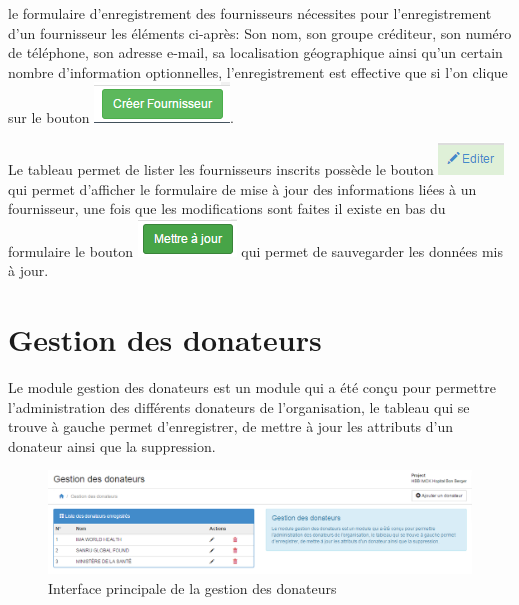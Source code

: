 \documentclass[12pt,a4paper]{report}
\begin{document}
le formulaire d'enregistrement des fournisseurs nécessites pour l'enregistrement d'un fournisseur les éléments ci-après: Son nom, son groupe créditeur, son numéro de téléphone, son adresse e-mail, sa localisation géographique ainsi qu'un certain nombre d'information optionnelles, l'enregistrement est effective que si l'on clique sur le bouton \includegraphics[scale=0.7]{pic/CreatSupplier.png}.

Le tableau permet de lister les fournisseurs inscrits possède le bouton \includegraphics[scale=0.7]{pic/EditSupplier.png} qui permet d'afficher le formulaire de mise à jour des informations liées à un fournisseur, une fois que les modifications sont faites il existe en bas du formulaire le bouton \includegraphics[scale=0.7]{pic/MettreJourSuppl.png} qui permet de sauvegarder les données mis à jour.
\newpage

\section{Gestion des donateurs}
Le module gestion des donateurs est un module qui a été conçu pour permettre l'administration des différents donateurs de l'organisation, le tableau qui se trouve à gauche permet d’enregistrer, de mettre à jour les attributs d'un donateur ainsi que la suppression.
\begin{figure}[h]
\begin{center}
\includegraphics[width=14cm]{pic/GestionDonateur.png}
\end{center}
\caption{Interface principale de la gestion des donateurs}
\label{Interface principale de la gestion des donateurs}
\end{figure}
\end{document}
